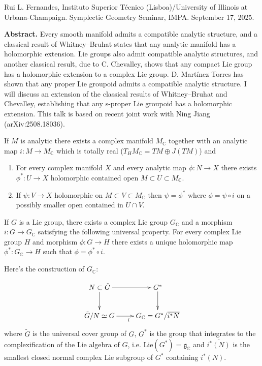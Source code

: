 \noindent
Rui L. Fernandes, Instituto Superior Técnico
(Lisboa)/University of Illinois
at Urbana-Champaign.
Symplectic Geometry Seminar, IMPA.
September 17, 2025.

\medskip\noindent
{\bf Abstract.} Every smooth manifold admits
a compatible analytic
structure, and a classical result of
Whitney–Bruhat states that any analytic
manifold has a holomorphic extension. Lie
groups also admit compatible analytic
structures, and another classical result, due
to C. Chevalley, shows that any
compact Lie group has a holomorphic extension
to a complex Lie group. D.
Martínez Torres has shown that any proper Lie
groupoid admits a compatible
analytic structure. I will discuss an
extension of the classical results of
Whitney–Bruhat and Chevalley, establishing
that any s-proper Lie groupoid has a
holomorphic extension. This talk is based on
recent joint work with Ning Jiang
(arXiv:2508.18036).

\medskip\noindent

\begin{theorem}
\label{theorem-Whitney-Beuhat}
If $M$ is analytic there exists a complex
manifold  $M_\mathbb{C}$
together with an analytic map $i: M \to
M_\mathbb{C}$
which is totally real ($T_HM_{\mathbb{C}}=TM
\oplus J(TM)$)
and
\begin{enumerate}
\item For every complex manifold $X$ and
every
analytic map $\phi:N \to X$ there exists
$\phi^*:U \to X$
holomorphic contained open $M \subset U
\subset M_\mathbb{C}$.
\item If $\psi:V \to X$ holomorphic on $M
\subset V \subset M_\mathbb{C}$ then
$\psi=\phi^*$ where $\phi=\psi \circ i$ on a
possibly
smaller open contained in $U \cap V$.
\end{enumerate}
\end{theorem}

\begin{theorem}[Chevalley]
\label{theorem-Chevalley}
If $G$ is a Lie group, there exists a complex
Lie group $G_{\mathbb{C}}$ and a morphism
$i:G \to G_\mathbb{C}$
satisfying the following universal property.
For every complex Lie group $H$ and morphism
$\phi:G \to H$ there exists a unique
holomorphic map $\phi^*:G_\mathbb{C} \to H$
such that
$\phi=\phi^* \circ i$.
\end{theorem}

Here's the construction of $G_\mathbb{C}$:

$$
\xymatrix{
N\subset \tilde{G}\ar[r]\ar[d]&G^*\ar[d]\\
\tilde{G}/N \simeq
G\ar[r]_{i}&G_\mathbb{C}=G^* /\overline{i^*N}
}
$$
where $\tilde{G}$ is the universal cover
group of $G$,
 $G^*$ is the group that integrates to
the complexification of the Lie algebra of
$G$,
i.e.
$\text{Lie}(G^*)=\mathfrak{g}_\mathbb{C}$
and $\overline{i^*(N)}$ is the smallest
closed
normal complex Lie subgroup of $G^*$
containing $i^*(N)$.

